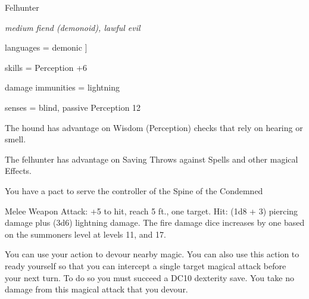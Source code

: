 \begin{monsterbox}{Felhunter}
	\begin{hangingpar}
		\textit{medium fiend (demonoid), lawful evil}
	\end{hangingpar}
	\dndline%
	\basics[armorclass = 15, hitpoints = 30 + 3 $\times$ player level, speed = 50 ft]
	\dndline%
	\stats[STR = \stat{17}, DEX = \stat{12}, CON = \stat{14}, INT = \stat{6}, WIS = \stat{13},	CHA = \stat{6}]
	\dndline
	languages = {demonic}
	]
	
	\dndline%
	
	skills = Perception +6
	
	damage immunities = lightning
	
	senses = blind, passive Perception 12
	
	\dndline%
	\begin{monsteraction}
		The hound has advantage on Wisdom (Perception) checks that rely on hearing or smell.
	\end{monsteraction}	
	\begin{monsteraction}
		The felhunter has advantage on Saving Throws against Spells and other magical Effects.
	\end{monsteraction}	
	\begin{monsteraction}
		You have a pact to serve the controller of the Spine of the Condemned
	\end{monsteraction}	
	\begin{monsteraction}[Bite]
		Melee Weapon Attack: +5 to hit, reach 5 ft., one target. Hit: (1d8 + 3) piercing damage plus (3d6) lightning damage. The fire damage dice increases by one based on the summoners level at levels 11, and 17.
	\end{monsteraction}	
	\begin{monsteraction}
		You can use your action to devour nearby magic. You can also use this action to ready yourself so that you can intercept a single target magical attack before your next turn. To do so you must succeed a DC10 dexterity save. You take no damage from this magical attack that you devour.
	\end{monsteraction}	
\end{monsterbox}

